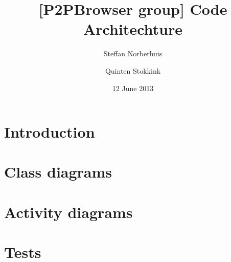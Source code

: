 \documentclass[a4paper,11pt]{article}
\title{[P2PBrowser group] Code Architechture}
\author{Steffan Norberhuis \and Quinten Stokkink}
\date{12 June 2013}
\begin{document}
   \maketitle

\section{Introduction}

\section{Class diagrams}


\section{Activity diagrams}


\section{Tests}

\end{document}
